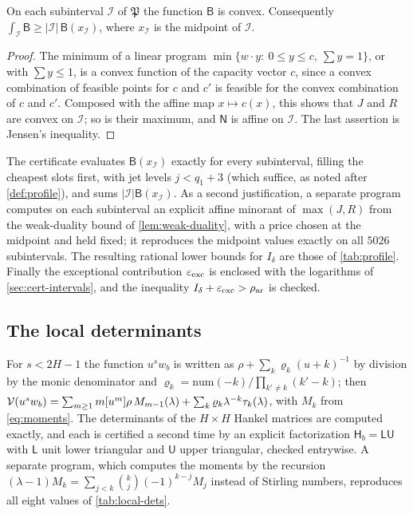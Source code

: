 \begin{lemma}\label{lem:profile-convex}
On each subinterval $\mathcal I$ of $\mathfrak P$ the function $\mathsf B$ is convex. Consequently $\int_{\mathcal I}\mathsf B\ge|\mathcal I|\,\mathsf B(x_{\mathcal I})$, where $x_{\mathcal I}$ is the midpoint of $\mathcal I$.
\end{lemma}

\begin{proof}
The minimum of a linear program $\min\{w\cdot y:\ 0\le y\le c,\ \sum y=1\}$, or with $\sum y\le1$, is a convex function of the capacity vector $c$, since a convex combination of feasible points for $c$ and $c'$ is feasible for the convex combination of $c$ and $c'$. Composed with the affine map $x\mapsto c(x)$, this shows that $J$ and $R$ are convex on $\mathcal I$; so is their maximum, and $\mathsf N$ is affine on $\mathcal I$. The last assertion is Jensen's inequality.
\end{proof}

The certificate evaluates $\mathsf B(x_{\mathcal I})$ exactly for every subinterval, filling the cheapest slots first, with jet levels $j<q_1+3$ (which suffice, as noted after \cref{def:profile}), and sums $|\mathcal I|\mathsf B(x_{\mathcal I})$. As a second justification, a separate program computes on each subinterval an explicit affine minorant of $\max(J,R)$ from the weak-duality bound of \cref{lem:weak-duality}, with a price chosen at the midpoint and held fixed; it reproduces the midpoint values exactly on all $5026$ subintervals. The resulting rational lower bounds for $I_\delta$ are those of \cref{tab:profile}. Finally the exceptional contribution $\varepsilon_{\mathrm{exc}}$ is enclosed with the logarithms of \cref{sec:cert-intervals}, and the inequality $I_\delta+\varepsilon_{\mathrm{exc}}>\rho_{\mathrm{ar}}$ is checked.

\subsection{The local determinants}\label{sec:cert-local}
For $s<2H-1$ the function $u^sw_b$ is written as $\rho+\sum_k\varrho_k(u+k)^{-1}$ by division by the monic denominator and $\varrho_k=\mathrm{num}(-k)/\prod_{k'\ne k}(k'-k)$; then $\mathcal{V}(u^sw_b)=\sum_{m\ge1}m[u^m]\rho\,M_{m-1}(\lambda)+\sum_k\varrho_k\lambda^{-k}\tau_k(\lambda)$, with $M_k$ from \eqref{eq:moments}. The determinants of the $H\times H$ Hankel matrices are computed exactly, and each is certified a second time by an explicit factorization $\mathsf H_b=\mathsf L\mathsf U$ with $\mathsf L$ unit lower triangular and $\mathsf U$ upper triangular, checked entrywise. A separate program, which computes the moments by the recursion $(\lambda-1)M_k=\sum_{j<k}\binom kj(-1)^{k-j}M_j$ instead of Stirling numbers, reproduces all eight values of \cref{tab:local-dets}.

